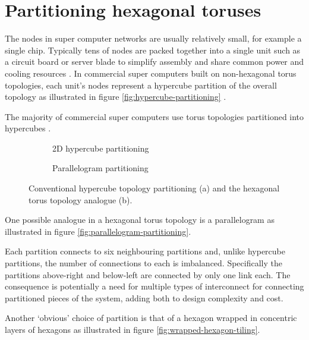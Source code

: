 \chapter{Partitioning hexagonal toruses}
	
	\label{sec:partitioning}
	
	The nodes in super computer networks are usually relatively small, for
	example a single chip. Typically tens of nodes are packed together into a
	single unit such as a circuit board or server blade to simplify assembly
	and share common power and cooling resources \cite{gilge14,ajima12}. In
	commercial super computers built on non-hexagonal torus topologies, each
	unit's nodes represent a hypercube partition of the overall topology as
	illustrated in figure \ref{fig:hypercube-partitioning}
	\cite{chen11,ajima12}.
	
	The majority of commercial
	super computers use torus topologies partitioned into hypercubes
	\cite{chen11,ajima12}.
	
	\begin{figure}
		\center
		\begin{subfigure}[b]{0.45\textwidth}
			\center
			\caption{2D hypercube partitioning}
			\label{fig:apdx-hypercube-partitioning}
		\end{subfigure}
		\begin{subfigure}[b]{0.45\textwidth}
			\center
			\caption{Parallelogram partitioning}
			\label{fig:apdx-parallelogram-partitioning}
		\end{subfigure}
		
		\caption{Conventional hypercube topology partitioning (a) and the
		hexagonal torus topology analogue (b).}
		\label{fig:apdx-partitioning-options}
	\end{figure}
	
	One possible analogue in a hexagonal torus topology is a parallelogram as
	illustrated in figure \ref{fig:parallelogram-partitioning}.
	
	Each partition connects to six neighbouring partitions and, unlike
	hypercube partitions, the number of connections to each is imbalanced.
	Specifically the partitions above-right and below-left are connected by
	only one link each. The consequence is potentially a need for multiple
	types of interconnect for connecting partitioned pieces of the system,
	adding both to design complexity and cost.
	
	Another `obvious' choice of partition is that of a hexagon wrapped in
	concentric layers of hexagons as illustrated in figure
	\ref{fig:wrapped-hexagon-tiling}.
	
